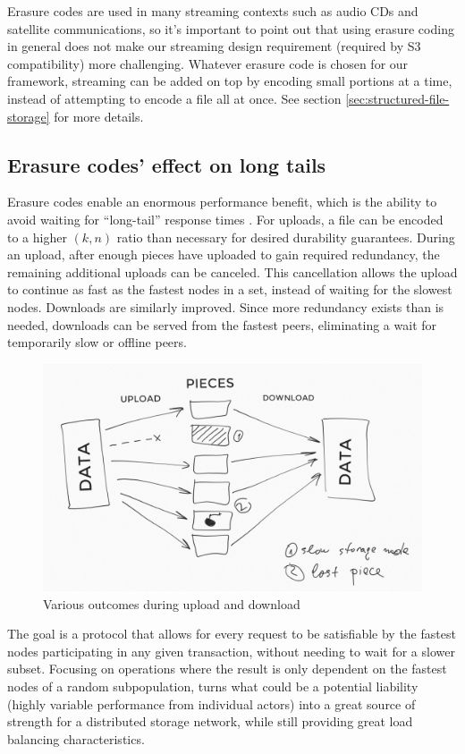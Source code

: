 \documentclass[11pt,fleqn,openany]{book}
\begin{document}
Erasure codes are used in many streaming contexts such as audio CDs and
satellite communications, so it's important to point out that using erasure
coding in general does not make our streaming design requirement
(required by S3 compatibility) more challenging.
Whatever erasure code is chosen for our framework, streaming can be
added on top by encoding small portions at a time, instead of attempting to
encode a file all at once. See section \ref{sec:structured-file-storage} for
more details.

\subsection{Erasure codes' effect on long tails}

Erasure codes enable an enormous performance benefit, which is the ability to
avoid waiting for ``long-tail'' response times \cite{tail-at-scale}. For uploads,
a file can be encoded to a higher $(k, n)$ ratio than necessary for desired
durability guarantees.
During an upload, after enough pieces have uploaded to gain required
redundancy, the remaining additional uploads can be canceled. This cancellation allows the
upload to continue as fast as the fastest nodes in a set, instead of waiting
for the slowest nodes.
Downloads are similarly improved. Since more redundancy exists
than is needed, downloads can be served from the fastest peers, eliminating a
wait for temporarily slow or offline peers.

\begin{figure}
\centering
\includegraphics[width=\textwidth]{diagram-drafts/redundancy.png}
\caption{Various outcomes during upload and download}
\end{figure}

The goal is a protocol that allows for every request to be satisfiable by the
fastest nodes participating in any given transaction, without needing to wait
for a slower subset.
Focusing on operations where the result is only dependent on the fastest
nodes of a random subpopulation, turns what could be a potential liability
(highly variable performance from individual actors) into a great source of
strength for a distributed storage network, while still providing great load
balancing characteristics.
\end{document}
